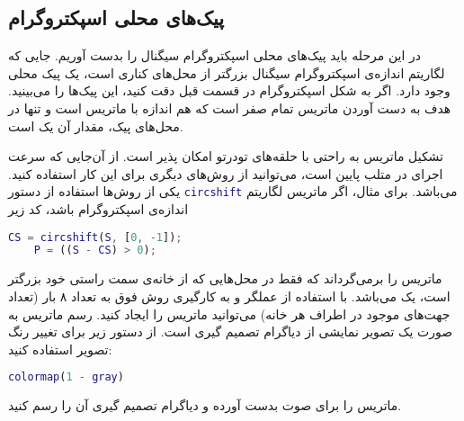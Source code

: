 \documentclass{utsignal}
\begin{document}
	\subsection{پیک‌های محلی اسپکتروگرام}
	در این مرحله باید پیک‌های محلی اسپکتروگرام سیگنال را بدست آوریم. جایی که لگاریتم اندازه‌ی اسپکتروگرام سیگنال بزرگتر از محل‌های کناری است، یک پیک محلی وجود دارد. اگر به شکل اسپکتروگرام در قسمت قبل دقت کنید، این پیک‌ها را می‌بینید. هدف به دست آوردن ماتریس تمام صفر  است که هم اندازه با ماتریس  است و تنها در محل‌های پیک، مقدار آن یک است.
	
	تشکیل ماتریس  به راحتی با حلقه‌های تودرتو امکان پذیر است. از آن‌جایی که سرعت اجرای  در متلب پایین است، می‌توانید از روش‌های دیگری برای این کار استفاده کنید. یکی از روش‌ها استفاده از دستور \lstinline[language=Matlab]{circshift} می‌باشد. برای مثال، اگر  ماتریس لگاریتم اندازه‌ی اسپکتروگرام باشد، کد زیر
	\begin{latin}
		\begin{lstlisting}[language=Matlab]
	CS = circshift(S, [0, -1]);
	P = ((S - CS) > 0);\end{lstlisting}
	\end{latin}
\noindent ماتریس  را برمی‌گرداند که فقط در محل‌هایی که  از خانه‌ی سمت راستی خود بزرگتر است، یک می‌باشد. با استفاده از عملگر \lr{\&} و به کارگیری روش فوق به تعداد ۸ بار (تعداد جهت‌های موجود در اطراف هر خانه) ‌می‌توانید ماتریس  را ایجاد کنید. رسم ماتریس  به صورت یک تصویر نمایشی از دیاگرام تصمیم گیری است.
از دستور زیر برای تغییر رنگ تصویر استفاده کنید:
	\begin{latin}
		\begin{lstlisting}[language=Matlab]
	colormap(1 - gray)\end{lstlisting}
	\end{latin}
ماتریس  را برای صوت  بدست آورده و دیاگرام تصمیم گیری آن را رسم کنید.
\end{document}
